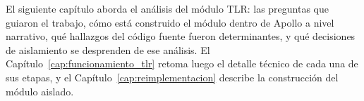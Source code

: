 El siguiente capítulo aborda el análisis del módulo TLR: las preguntas que guiaron el trabajo, cómo está construido el módulo dentro de Apollo a nivel narrativo, qué hallazgos del código fuente fueron determinantes, y qué decisiones de aislamiento se desprenden de ese análisis. El Capítulo~\ref{cap:funcionamiento_tlr} retoma luego el detalle técnico de cada una de sus etapas, y el Capítulo~\ref{cap:reimplementacion} describe la construcción del módulo aislado.